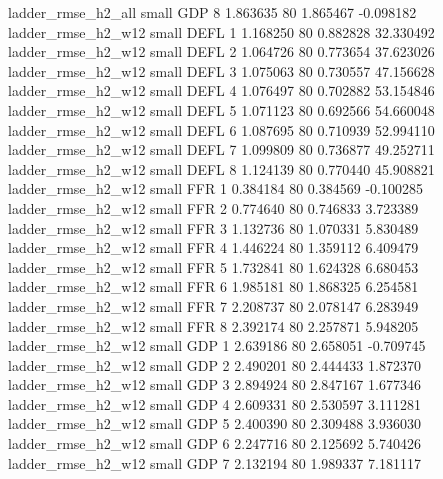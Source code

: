       ladder_rmse_h2_all      small      GDP                 8 1.863635 80       1.865467          -0.098182
      ladder_rmse_h2_w12      small     DEFL                 1 1.168250 80       0.882828          32.330492
      ladder_rmse_h2_w12      small     DEFL                 2 1.064726 80       0.773654          37.623026
      ladder_rmse_h2_w12      small     DEFL                 3 1.075063 80       0.730557          47.156628
      ladder_rmse_h2_w12      small     DEFL                 4 1.076497 80       0.702882          53.154846
      ladder_rmse_h2_w12      small     DEFL                 5 1.071123 80       0.692566          54.660048
      ladder_rmse_h2_w12      small     DEFL                 6 1.087695 80       0.710939          52.994110
      ladder_rmse_h2_w12      small     DEFL                 7 1.099809 80       0.736877          49.252711
      ladder_rmse_h2_w12      small     DEFL                 8 1.124139 80       0.770440          45.908821
      ladder_rmse_h2_w12      small      FFR                 1 0.384184 80       0.384569          -0.100285
      ladder_rmse_h2_w12      small      FFR                 2 0.774640 80       0.746833           3.723389
      ladder_rmse_h2_w12      small      FFR                 3 1.132736 80       1.070331           5.830489
      ladder_rmse_h2_w12      small      FFR                 4 1.446224 80       1.359112           6.409479
      ladder_rmse_h2_w12      small      FFR                 5 1.732841 80       1.624328           6.680453
      ladder_rmse_h2_w12      small      FFR                 6 1.985181 80       1.868325           6.254581
      ladder_rmse_h2_w12      small      FFR                 7 2.208737 80       2.078147           6.283949
      ladder_rmse_h2_w12      small      FFR                 8 2.392174 80       2.257871           5.948205
      ladder_rmse_h2_w12      small      GDP                 1 2.639186 80       2.658051          -0.709745
      ladder_rmse_h2_w12      small      GDP                 2 2.490201 80       2.444433           1.872370
      ladder_rmse_h2_w12      small      GDP                 3 2.894924 80       2.847167           1.677346
      ladder_rmse_h2_w12      small      GDP                 4 2.609331 80       2.530597           3.111281
      ladder_rmse_h2_w12      small      GDP                 5 2.400390 80       2.309488           3.936030
      ladder_rmse_h2_w12      small      GDP                 6 2.247716 80       2.125692           5.740426
      ladder_rmse_h2_w12      small      GDP                 7 2.132194 80       1.989337           7.181117
